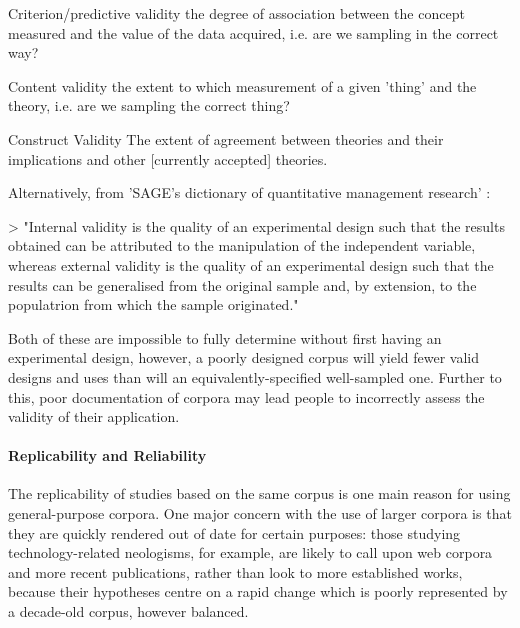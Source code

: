 \begin{itemizeTitle}
 \item [Criterion/predictive validity] the degree of association between the concept measured and the value of the data acquired, i.e. are we sampling in the correct way?
 \item [Content validity] the extent to which measurement of a given 'thing' and the theory, i.e. are we sampling the correct thing?
 \item [Construct Validity] The extent of agreement between theories and their implications and other [currently accepted] theories. 
\end{itemizeTitle}

Alternatively, from 'SAGE's dictionary of quantitative management research' :

> "Internal validity is the quality of an experimental design such that the results obtained can be attributed to the manipulation of the independent variable, whereas external validity is the quality of an experimental design such that the results can be generalised from the original sample and, by extension, to the populatrion from which the sample originated."

Both of these are impossible to fully determine without first having an experimental design, however, a poorly designed corpus will yield fewer valid designs and uses than will an equivalently-specified well-sampled one.  Further to this, poor documentation of corpora may lead people to incorrectly assess the validity of their application.





\paragraph{Replicability and Reliability}
The replicability of studies based on the same corpus is one main reason for using general-purpose corpora.  One major concern with the use of larger corpora is that they are quickly rendered out of date for certain purposes: those studying technology-related neologisms, for example, are likely to call upon web corpora and more recent publications, rather than look to more established works, because their hypotheses centre on a rapid change which is poorly represented by a decade-old corpus, however balanced.

